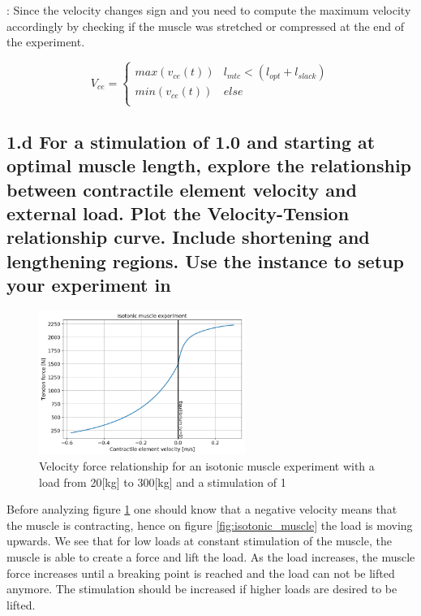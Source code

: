 \documentclass{cmc}
\begin{document}
 : Since the velocity changes sign and you need to compute the maximum
velocity accordingly by checking if the muscle was stretched or compressed
at the end of the experiment.

\begin{equation}
  \label{eq:2}
 V_{ce} = \left\{
\begin{array}{ll}
      max(v_{ce}(t)) & l_{mtc} < (l_{opt} + l_{slack}) \\
      min(v_{ce}(t)) & else \\
\end{array}
\right.
\end{equation}

\subsection*{1.d For a stimulation of 1.0 and starting at optimal
  muscle length, explore the relationship between contractile element
  velocity and external load. Plot the Velocity-Tension relationship
  curve. Include shortening and lengthening regions. Use the
   instance
  to setup your experiment in }

\begin{figure}[H]
    \centering
    \includegraphics[width=0.6\textwidth]{figures/1_d_isotonic_load_var.png}
    \caption{Velocity force relationship for an isotonic muscle experiment with a load from 20[kg] to 300[kg] and a stimulation of 1}
    \label{fig:Exercise1d}
\end{figure}

Before analyzing figure \ref{fig:Exercise1d} one should know that a negative velocity means that the muscle is contracting, hence on figure \ref{fig:isotonic_muscle} the load is moving upwards. We see that for low loads at constant stimulation of the muscle, the muscle is able to create a force and lift the load. As the load increases, the muscle force increases until a breaking point is reached and the load can not be lifted anymore. The stimulation should be increased if higher loads are desired to be lifted.
\end{document}
